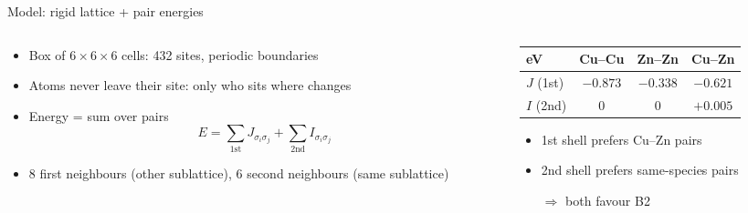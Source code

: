 \documentclass[aspectratio=169, 11pt]{beamer}
\begin{document}
\begin{frame}{Model: rigid lattice + pair energies}
  \begin{columns}[T]
    \begin{column}{0.5\textwidth}
      \begin{itemize}
        \item Box of $6\times6\times6$ cells: \alert{432 sites}, periodic boundaries
        \item Atoms never leave their site: only \alert{who sits where} changes
        \item Energy = sum over pairs
          \[ E = \sum_{\text{1st}} J_{\sigma_i\sigma_j} + \sum_{\text{2nd}} I_{\sigma_i\sigma_j} \]
        \item 8 first neighbours (other sublattice), 6 second neighbours (same sublattice)
      \end{itemize}
    \end{column}
    \begin{column}{0.46\textwidth}
      \centering
      \small
      \begin{tabular}{lccc}
        \toprule
        eV & Cu--Cu & Zn--Zn & Cu--Zn \\
        \midrule
        $J$ (1st) & $-0.873$ & $-0.338$ & $-0.621$ \\
        $I$ (2nd) & $0$ & $0$ & $+0.005$ \\
        \bottomrule
      \end{tabular}

      \bigskip
      \begin{itemize}
        \item 1st shell prefers \alert{Cu--Zn} pairs
        \item 2nd shell prefers \alert{same-species} pairs
        \item[$\Rightarrow$] both favour B2
      \end{itemize}
    \end{column}
  \end{columns}
\end{frame}
\end{document}
